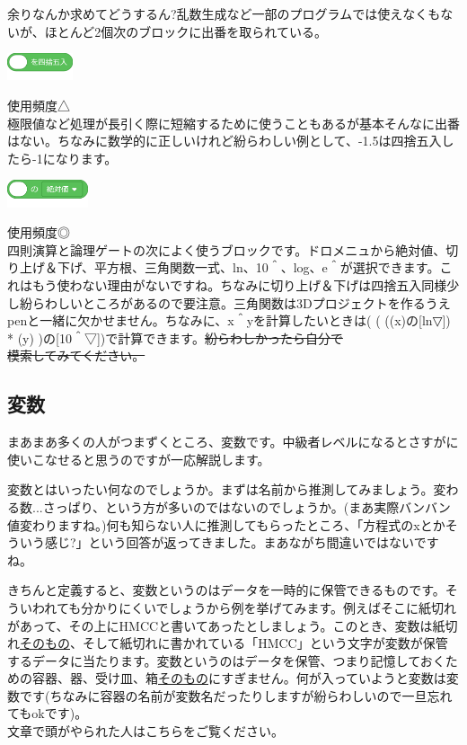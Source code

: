 \documentclass[b5paper,10pt]{jsarticle}
\begin{document}
\begin{multicols*}{3}
余りなんか求めてどうするん?乱数生成など一部のプログラムでは使えなくもないが、ほとんど2個次のブロックに出番を取られている。
\begin{itembox}{11}
\includegraphics[height=8mm]{images/operators_17.png}
\end{itembox}
使用頻度△\\
極限値など処理が長引く際に短縮するために使うこともあるが基本そんなに出番はない。ちなみに数学的に正しいけれど紛らわしい例として、-1.5は四捨五入したら-1になります。
\begin{itembox}{12}
\includegraphics[height=8mm]{images/operators_18.png}
\end{itembox}
使用頻度◎\\
四則演算と論理ゲートの次によく使うブロックです。ドロメニュから絶対値、切り上げ＆下げ、平方根、三角関数一式、ln、10＾、log、e＾が選択できます。これはもう使わない理由がないですね。ちなみに切り上げ＆下げは四捨五入同様少し紛らわしいところがあるので要注意。三角関数は3Dプロジェクトを作るうえpenと一緒に欠かせません。ちなみに、x＾yを計算したいときは( ( ((x)の[ln▽]) * (y) )の[10＾▽])で計算できます。\sout{紛らわしかったら自分で\\模索してみてください。}

\subsection{変数}

まあまあ多くの人がつまずくところ、変数です。中級者レベルになるとさすがに使いこなせると思うのですが一応解説します。

変数とはいったい何なのでしょうか。まずは名前から推測してみましょう。変わる数...さっぱり、という方が多いのではないのでしょうか。(まあ実際バンバン値変わりますね。)何も知らない人に推測してもらったところ、「方程式のxとかそういう感じ?」という回答が返ってきました。まあながち間違いではないですね。

きちんと定義すると、変数というのはデータを一時的に保管できるものです。そういわれても分かりにくいでしょうから例を挙げてみます。例えばそこに紙切れがあって、その上にHMCCと書いてあったとしましょう。このとき、変数は紙切れ\underline{そのもの}、そして紙切れに書かれている「HMCC」という文字が変数が保管するデータに当たります。変数というのはデータを保管、つまり記憶しておくための容器、器、受け皿、箱\underline{そのもの}にすぎません。何が入っていようと変数は変数です(ちなみに容器の名前が変数名だったりしますが紛らわしいので一旦忘れてもokです)。\\ 
文章で頭がやられた人はこちらをご覧ください。


\end{multicols*}
\end{document}
